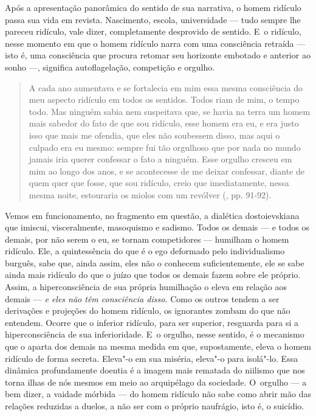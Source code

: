 Após a apresentação panorâmica do sentido de sua narrativa, o homem
ridículo passa sua vida em revista. Nascimento, escola, universidade ---
tudo sempre lhe pareceu ridículo, vale dizer, completamente desprovido
de sentido. E~o ridículo, nesse momento em que o homem ridículo narra
com uma consciência retraída --- isto é, uma consciência que procura
retomar seu horizonte embotado e anterior ao sonho ---, significa
autoflagelação, competição e orgulho.

\begin{quote}
A cada ano aumentava e se fortalecia em mim essa mesma consciência do
meu aspecto ridículo em todos os sentidos. Todos riam de mim, o tempo
todo. Mas ninguém sabia nem suspeitava que, se havia na terra um homem
mais sabedor do fato de que sou ridículo, esse homem era eu, e era justo
isso que mais me ofendia, que eles não soubessem disso, mas aqui o
culpado era eu mesmo: sempre fui tão orgulhoso que por nada no mundo
jamais iria querer confessar o fato a ninguém. Esse orgulho cresceu em
mim ao longo dos anos, e se acontecesse de me deixar confessar, diante
de quem quer que fosse, que sou ridículo, creio que imediatamente, nessa
mesma noite, estouraria os miolos com um revólver (, pp. 91-92).
\end{quote}

Vemos em funcionamento, no fragmento em questão, a dialética
dostoievskiana que imiscui, visceralmente, masoquismo e sadismo. Todos
os demais --- e todos os demais, por não serem o eu, se tornam
competidores --- humilham o homem ridículo. Ele, a quintessência do que é
o ego deformado pelo individualismo burguês, sabe que, ainda assim, eles
não o conhecem suficientemente, ele se sabe ainda mais ridículo do que o
juízo que todos os demais fazem sobre ele próprio. Assim, a
hiperconsciência de sua própria humilhação o eleva em relação aos demais
--- \emph{e eles não têm consciência disso.} Como os outros tendem a ser
derivações e projeções do homem ridículo, os ignorantes zombam do que
não entendem. Ocorre que o inferior ridículo, para ser superior,
resguarda para si a hiperconsciência de sua inferioridade. E~o orgulho,
nesse sentido, é o mecanismo que o aparta dos demais na mesma medida em
que, supostamente, eleva o homem ridículo de forma secreta. Eleva"-o em
sua miséria, eleva"-o para isolá"-lo. Essa dinâmica profundamente doentia
é a imagem mais rematada do niilismo que nos torna ilhas de nós mesmos
em meio ao arquipélago da sociedade. O~orgulho --- a bem dizer, a vaidade
mórbida --- do homem ridículo não sabe como abrir mão das relações
reduzidas a duelos, a não ser com o próprio naufrágio, isto é, o
suicídio.

